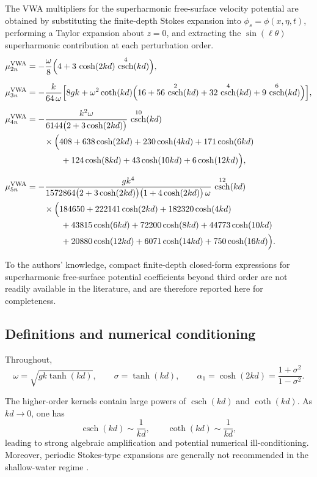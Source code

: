 \documentclass[lineno]{JFM-FLM_Au}
\DeclareMathOperator{\csch}{csch}
\begin{document}
\begin{appen}
The VWA multipliers for the superharmonic free-surface velocity potential are obtained by substituting the finite-depth Stokes expansion into $\phi_s=\phi(x,\eta,t)$, performing a Taylor expansion about $z=0$, and extracting the $\sin(\ell\theta)$ superharmonic contribution at each perturbation order.
\begin{subequations}\label{app:VWA_mu_kernels}
\begin{align}
\mu^{\mathrm{VWA}}_{2n}
&=
-\frac{\omega}{8}
\Bigl(
4 + 3\,\cosh(2kd)\,\csch^{4}(kd)
\Bigr),
\\[2mm]
%
\mu^{\mathrm{VWA}}_{3n}
&=
-\frac{k}{64\,\omega}
\Bigl[
8gk
+\omega^{2}\coth(kd)
\Bigl(
16+56\,\csch^{2}(kd)
+32\,\csch^{4}(kd)
+9\,\csch^{6}(kd)
\Bigr)
\Bigr],
\\[2mm]
%
\mu^{\mathrm{VWA}}_{4n}
&=
-\frac{k^{2}\omega}
{6144\bigl(2+3\cosh(2kd)\bigr)}
\,\csch^{10}(kd)
\nonumber\\
&\qquad\times
\Bigl(
408 + 638\cosh(2kd) + 230\cosh(4kd)
+ 171\cosh(6kd)
\nonumber\\
&\qquad\qquad
+ 124\cosh(8kd)
+ 43\cosh(10kd)
+ 6\cosh(12kd)
\Bigr),
\\[2mm]
%
\mu^{\mathrm{VWA}}_{5n}
&=
-\frac{gk^{4}}
{1572864\bigl(2+3\cosh(2kd)\bigr)
\bigl(1+4\cosh(2kd)\bigr)\,\omega}
\,\csch^{12}(kd)
\nonumber\\
&\qquad\times
\Bigl(
184650
+ 222141\cosh(2kd)
+ 182320\cosh(4kd)
\nonumber\\
&\qquad\qquad
+ 43815\cosh(6kd)
+ 72200\cosh(8kd)
+ 44773\cosh(10kd)
\nonumber\\
&\qquad\qquad
+ 20880\cosh(12kd)
+ 6071\cosh(14kd)
+ 750\cosh(16kd)
\Bigr).
\end{align}
\end{subequations}

To the authors' knowledge, compact finite-depth closed-form expressions for superharmonic
free-surface potential coefficients beyond third order are not readily available in the literature,
and are therefore reported here for completeness.

\subsection{Definitions and numerical conditioning}\label{appC:defs_safeguard}

Throughout,
\[
\omega = \sqrt{gk\tanh(kd)},
\qquad
\sigma=\tanh(kd),
\qquad
\alpha_1=\cosh(2kd)=\frac{1+\sigma^2}{1-\sigma^2}.
\]

The higher-order kernels contain large powers of $\csch(kd)$ and $\coth(kd)$.
As $kd\to 0$, one has
\[
\csch(kd)\sim \frac{1}{kd},
\qquad
\coth(kd)\sim \frac{1}{kd},
\]
leading to strong algebraic amplification and potential numerical ill-conditioning.
Moreover, periodic Stokes-type expansions are generally not recommended in the shallow-water regime
\citep{le2013introduction,fenton1985fifth,fenton1990nonlinear,fenton1999cnoidal,holthuijsen2010waves,zhao_guide_2024}.


\end{appen}
\end{document}
